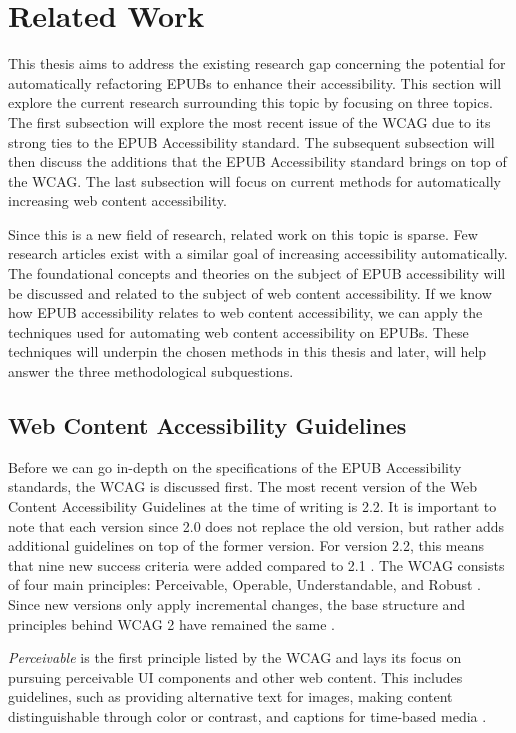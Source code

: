 \section{Related Work}
\label{sec:related_work}
This thesis aims to address the existing research gap concerning the potential for automatically refactoring EPUBs to enhance their accessibility. This section will explore the current research surrounding this topic by focusing on three topics. The first subsection will explore the most recent issue of the WCAG due to its strong ties to the EPUB Accessibility standard. The subsequent subsection will then discuss the additions that the EPUB Accessibility standard brings on top of the WCAG. The last subsection will focus on current methods for automatically increasing web content accessibility.

Since this is a new field of research, related work on this topic is sparse. Few research articles exist with a similar goal of increasing accessibility automatically. The foundational concepts and theories on the subject of EPUB accessibility will be discussed and related to the subject of web content accessibility. If we know how EPUB accessibility relates to web content accessibility, we can apply the techniques used for automating web content accessibility on EPUBs. These techniques will underpin the chosen methods in this thesis and later, will help answer the three methodological subquestions.


\subsection{Web Content Accessibility Guidelines}
Before we can go in-depth on the specifications of the EPUB Accessibility standards, the WCAG is discussed first. The most recent version of the Web Content Accessibility Guidelines at the time of writing is 2.2. It is important to note that each version since 2.0 does not replace the old version, but rather adds additional guidelines on top of the former version. For version 2.2, this means that nine new success criteria were added compared to 2.1 \cite{WCAGGuidelines}. The WCAG consists of four main principles: Perceivable, Operable, Understandable, and Robust \cite{Caldwell2008}. Since new versions only apply incremental changes, the base structure and principles behind WCAG 2 have remained the same \cite{WCAGGuidelines}.

\textit{Perceivable} is the first principle listed by the WCAG and lays its focus on pursuing perceivable UI components and other web content. This includes guidelines, such as providing alternative text for images, making content distinguishable through color or contrast, and captions for time-based media \cite{Caldwell2008}.


